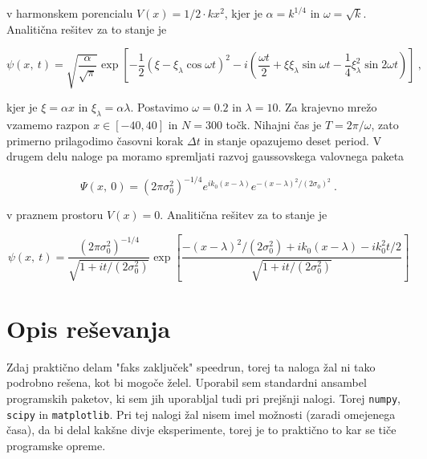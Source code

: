 \documentclass[a4paper]{article}
\begin{document}
v harmonskem porencialu $V(x) = 1/2\cdot k x^2$, kjer je $\alpha = k^{1/4}$ in $\omega = \sqrt{k}$.
Analitična rešitev za to stanje je

\begin{equation}
    \psi(x,\>t) = \sqrt{\frac{\alpha}{\sqrt{\pi}}} \exp{\left[-\frac{1}{2}(\xi - 
    \xi_\lambda \cos{\omega t})^2-
    i\left(\frac{\omega t}{2} + \xi\xi_\lambda \sin{\omega t} - 
    \frac{1}{4}\xi_\lambda^2\sin{2\omega t}\right)\right]}\>,
    \label{analiticna_resitev1}
\end{equation}

kjer je $\xi=\alpha x$ in $\xi_\lambda = \alpha\lambda$. Postavimo $\omega=0.2$ in $\lambda=10$.
Za krajevno mrežo vzamemo razpon $x\in[-40, 40]$ in $N=300$ točk. Nihajni čas je $T=2\pi/\omega$,
zato primerno prilagodimo časovni korak $\Delta t$ in stanje opazujemo deset period. V drugem delu naloge pa moramo spremljati razvoj gaussovskega valovnega paketa 

\begin{equation}
    \Psi(x,\>0) = (2\pi\sigma_0^2)^{-1/4} e^{ik_0(x-\lambda)}e^{-(x-\lambda)^2/(2\sigma_0)^2}\>.
    \label{zacetno_stanje2}
\end{equation}

v praznem prostoru $V(x) = 0$. Analitična rešitev za to stanje je

\begin{equation}
    \psi(x,\>t) = \frac{(2\pi\sigma_0^2)^{-1/4}}{\sqrt{1 + i t/(2\sigma_0^2)}}
    \exp{\left[\frac{-(x-\lambda)^2/(2\sigma_0^2) + ik_0(x-\lambda)-ik_0^2 t/2}
    {\sqrt{1 + i t/(2\sigma_0^2)}}\right]}
    \label{analiticna_resitev2}
\end{equation}
\section{Opis reševanja}
Zdaj praktično delam "faks zaključek" speedrun, torej ta naloga žal ni tako podrobno rešena,
kot bi mogoče želel. Uporabil sem standardni ansambel programskih paketov, ki sem jih uporabljal
tudi pri prejšnji nalogi. Torej \texttt{numpy}, \texttt{scipy} in \texttt{matplotlib}. Pri tej nalogi
žal nisem imel možnosti (zaradi omejenega časa), da bi delal kakšne divje eksperimente, torej je to praktično to
kar se tiče programske opreme.\\
\end{document}
